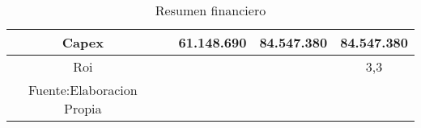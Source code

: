 \begin{longtable}{|c|c|c|c|c|}
Capex            &                                                                                   & 61.148.690                                                            & 84.547.380                                                              & 84.547.380  \\ \hline
Roi              &                                                                                   &                                                                       &                                                                         & 3,3         \\ \hline
\caption{Resumen financiero}{Fuente:Elaboracion Propia}
\label{table:Resumen}
\end{longtable}


